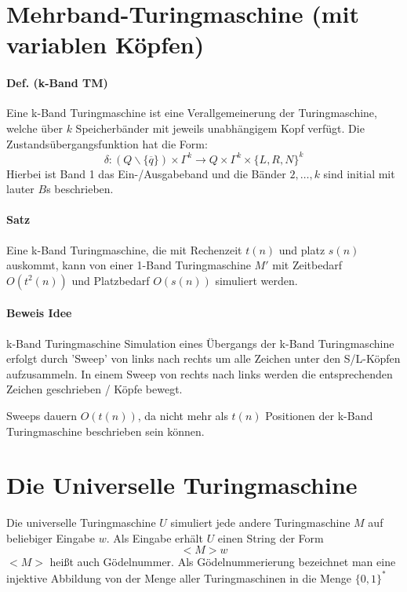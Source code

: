 \section{Mehrband-Turingmaschine (mit variablen Köpfen)}

\paragraph*{Def. (k-Band TM)} Eine k-Band Turingmaschine ist eine Verallgemeinerung der Turingmaschine, welche über $k$ Speicherbänder mit jeweils unabhängigem Kopf verfügt. Die Zustandsübergangsfunktion hat die Form: $$ \delta : (Q\backslash\{\overline{q}\}) \times \Gamma^k \rightarrow Q \times \Gamma^k \times \{L,R,N\}^k $$ Hierbei ist Band 1 das Ein-/Ausgabeband und die Bänder $2,\dots,k$ sind initial mit lauter $B$s beschrieben.

\paragraph*{Satz} Eine k-Band Turingmaschine, die mit Rechenzeit $t(n)$ und platz $s(n)$ auskommt, kann von einer 1-Band Turingmaschine $M'$ mit Zeitbedarf $O(t^2(n))$ und Platzbedarf $O(s(n))$ simuliert werden.

\paragraph*{Beweis Idee} k-Band Turingmaschine %
Simulation eines Übergangs der k-Band Turingmaschine erfolgt durch 'Sweep' von links nach rechts um alle Zeichen unter den S/L-Köpfen aufzusammeln. In einem Sweep von rechts nach links werden die entsprechenden Zeichen geschrieben / Köpfe bewegt.

\par\medskip
Sweeps dauern $O(t(n))$, da nicht mehr als $t(n)$ Positionen der k-Band Turingmaschine beschrieben sein können.\par\medskip

\section{Die Universelle Turingmaschine}

Die universelle Turingmaschine $U$ simuliert jede andere Turingmaschine $M$ auf beliebiger Eingabe $w$. Als Eingabe erhält $U$ einen String der Form $$<M>w$$ $<M>$ heißt auch Gödelnummer. Als Gödelnummerierung bezeichnet man eine injektive Abbildung von der Menge aller Turingmaschinen in die Menge $\{0,1\}^*$ %

